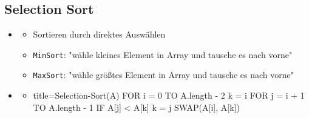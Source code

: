 \documentclass[
    12pt,
    a4paper,
    ngerman,
    color=3b,%
    marginpar=false,
    colorback=false,
    leqno,
]{tudaexercise}
\begin{document}
\clearpage
\subsection{Selection Sort}\label{Selection sort}
\begin{itemize}
    \item {}
          \begin{itemize}
              \item Sortieren durch direktes Auswählen
              \item \texttt{MinSort}: "wähle kleines Element in Array und tausche es nach vorne"
              \item \texttt{MaxSort}: "wähle größtes Element in Array und tausche es nach vorne"
          \end{itemize}

    \item {}
          \begin{itemize}
              \item[]
                    \begin{ccode}[autogobble]{title=Selection-Sort(A)}
                        FOR i = 0 TO A.length - 2
                            k = i
                            FOR j = i + 1 TO A.length - 1
                                IF A[j] < A[k]
                                    k = j
                            SWAP(A[i], A[k])
                    \end{ccode}
          \end{itemize}
\end{itemize}

\end{document}
